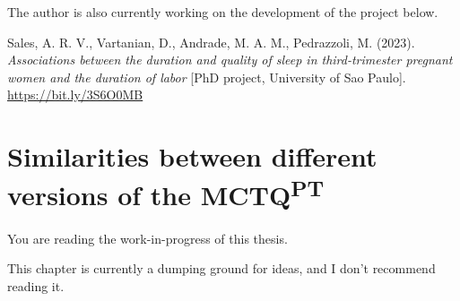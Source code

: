 \documentclass[
12pt,
openright,
oneside,
a4paper,
chapter=TITLE,
section=TITLE,
french,
spanish,
brazil,
english
]{abntex2}\usepackage{array}
\newcommand{\microskip}{\vspace{\microskipamount}}
\begin{document}
The author is also currently working on the development of the project
below.

\smallskip

\noindent Sales, A. R. V., Vartanian, D., Andrade, M. A. M., Pedrazzoli,
M. (2023). \emph{Associations between the duration and quality of sleep
in third-trimester pregnant women and the duration of labor} {[}PhD
project, University of Sao Paulo{]}. \url{https://bit.ly/3S6O0MB}


\chapter{\texorpdfstring{Similarities between different versions of the
MCTQ\textsuperscript{PT}}{Similarities between different versions of the MCTQPT}}\label{similarities-between-different-versions-of-the-mctqpt}

\begin{tcolorbox}[enhanced jigsaw, arc=.35mm, toprule=.15mm, opacitybacktitle=0.6, rightrule=.15mm, opacityback=0, colframe=quarto-callout-important-color-frame, titlerule=0mm, colback=white, toptitle=1mm, coltitle=black, left=2mm, colbacktitle=quarto-callout-important-color!10!white, title=\textcolor{quarto-callout-important-color}{\faExclamation}\hspace{0.5em}{Important}, bottomrule=.15mm, breakable, bottomtitle=1mm, leftrule=.75mm]

You are reading the work-in-progress of this thesis.

\microskip

This chapter is currently a dumping ground for ideas, and I don't
recommend reading it.

\end{tcolorbox}
\end{document}

